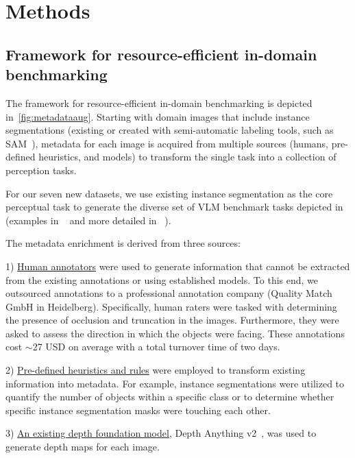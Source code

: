 \section{Methods}



\subsection{Framework for resource-efficient in-domain benchmarking
}
The framework for resource-efficient in-domain benchmarking is depicted in~\cref{fig:metadataaug}. Starting with domain images that include instance segmentations (existing or created with semi-automatic labeling tools, such as SAM~\cite{ravi2024sam}), metadata for each image is acquired from multiple sources (humans, pre-defined heuristics, and models) to transform the single task into a collection of perception tasks.

For our seven new datasets, we use existing instance segmentation as the core perceptual task to generate the diverse set of VLM benchmark tasks depicted in  (examples in ~ and more detailed in ~).

The metadata enrichment is derived from three sources: 

1) \underline{Human annotators} were used to generate information that cannot be extracted from the existing annotations or using established models. To this end, we outsourced annotations to a professional annotation company (Quality Match GmbH in Heidelberg). Specifically, human raters were tasked with determining the presence of occlusion and truncation in the images. Furthermore, they were asked to assess the direction in which the objects were facing. These annotations cost $\sim$27 USD on average with a total turnover time of two days. 

2) \underline{Pre-defined heuristics and rules} were employed to transform existing information into metadata. For example, instance segmentations were utilized to quantify the number of objects within a specific class or to determine whether specific instance segmentation masks were touching each other. 

3) \underline{An existing depth foundation model}, Depth Anything v2~\cite{yang2024depth}, was used to generate depth maps for each image.


